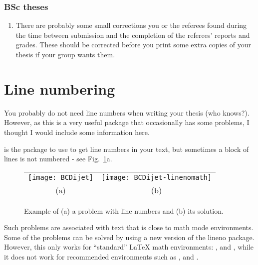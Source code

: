 \subsubsection{BSc theses}

\begin{enumerate}
\item There are probably some small corrections you or the referees
  found during the time between submission and the completion of the
  referees' reports and grades. These should be corrected before you
  print some extra copies of your thesis if your group wants them.
\end{enumerate}


\section{Line numbering}
\label{sec:tips:lineno}

You probably do not need line numbers when writing your
thesis (who knows?). However, as this is a very useful package that
occasionally has some problems, I thought I would include some
information here.

 is the package to use to get line numbers in your text,
but sometimes a block of lines is not numbered - see Fig.~\ref{fig:lineno}a.

\begin{figure}[htbp]
  \centering
  \begin{tabular}{cc}
  \texttt{[image: BCDijet]} &
  \texttt{[image: BCDijet-linenomath]}\\
  (a) & (b)
  \end{tabular}
  \caption{Example of (a) a problem with line numbers and (b) its solution.}
  \label{fig:lineno}
\end{figure}

Such problems are associated with text that is close to math mode
environments. Some of the problems can be solved by using a new
version of the lineno package.
However, this only works for \enquote{standard} \LaTeX{}
math environments: ,  and , while it does
not work for recommended  environments such as ,
 and .

